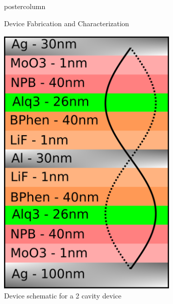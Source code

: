 \documentclass[10pt,papersize={24in,36in}]{beamer}
\begin{document}
\begin{frame}
\begin{columns}
\begin{column}{.49\textwidth}
\begin{beamercolorbox}[center,wd=\textwidth]{postercolumn}
\begin{minipage}[T]{.95\textwidth}
{\begin{block}{Device Fabrication and Characterization}
\begin{minipage}{0.45\textwidth}
                    \includegraphics[width=0.65\textwidth]{images/schematic.png}\\
                    \small Device schematic for a 2 cavity device
                \end{minipage}


\end{block}}
\end{minipage}
\end{beamercolorbox}
\end{column}
\end{columns}
\end{frame}
\end{document}
